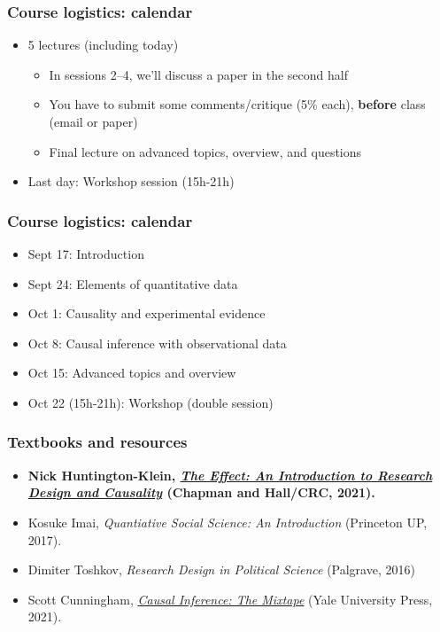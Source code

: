 \documentclass[aspectratio=43]{beamer}
\begin{document}
\begin{frame}
\frametitle{Course logistics: calendar}
\centering

\begin{itemize}
  \item 5 lectures (including today)
  \begin{itemize}
    \item In sessions 2--4, we'll discuss a paper in the second half
    \item You have to submit some comments/critique (5\% each), \textbf{before} class (email or paper)
    \item Final lecture on advanced topics, overview, and questions
  \end{itemize}
  \item Last day: Workshop session (15h-21h)
\end{itemize}

\end{frame}

\begin{frame}
\frametitle{Course logistics: calendar}
\centering

\begin{itemize}
  \item Sept 17: Introduction
  \item Sept 24: Elements of quantitative data
  \item Oct 1: Causality and experimental evidence
  \item Oct 8: Causal inference with observational data
  \item Oct 15: Advanced topics and overview
  \item Oct 22 (15h-21h): Workshop (double session)
\end{itemize}

\end{frame}

\begin{frame}
\frametitle{Textbooks and resources}
\centering

\begin{itemize}
  \item \textbf{Nick Huntington-Klein, \href{https://theeffectbook.net/}{\textit{The Effect: An Introduction to Research Design and Causality}} (Chapman and Hall/CRC, 2021).}
  \item Kosuke Imai, \textit{Quantiative Social Science: An Introduction} (Princeton UP, 2017).
  \item Dimiter Toshkov, \textit{Research Design in Political Science} (Palgrave, 2016)
  \item Scott Cunningham, \href{https://mixtape.scunning.com/}{\textit{Causal Inference: The Mixtape}} (Yale University Press, 2021).
\end{itemize}

\end{frame}
\end{document}
